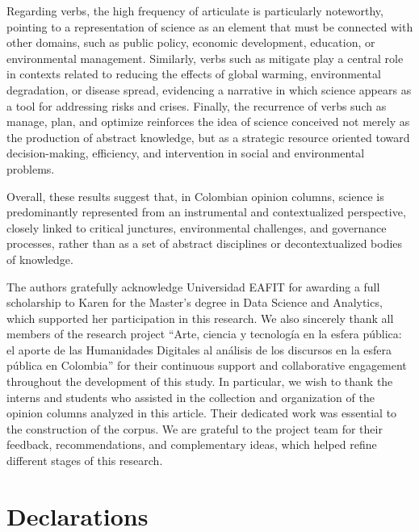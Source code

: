 \documentclass[pdflatex,sn-mathphys-num, iicol]{sn-jnl}
\begin{document}
	
	Regarding verbs, the high frequency of articulate is particularly noteworthy, pointing to a representation of science as an element that must be connected with other domains, such as public policy, economic development, education, or environmental management. Similarly, verbs such as mitigate play a central role in contexts related to reducing the effects of global warming, environmental degradation, or disease spread, evidencing a narrative in which science appears as a tool for addressing risks and crises. Finally, the recurrence of verbs such as manage, plan, and optimize reinforces the idea of science conceived not merely as the production of abstract knowledge, but as a strategic resource oriented toward decision-making, efficiency, and intervention in social and environmental problems.
	
	
	Overall, these results suggest that, in Colombian opinion columns, science is predominantly represented from an instrumental and contextualized perspective, closely linked to critical junctures, environmental challenges, and governance processes, rather than as a set of abstract disciplines or decontextualized bodies of knowledge.
	
	
	\backmatter
	
	
	The authors gratefully acknowledge Universidad EAFIT for awarding a full scholarship to Karen for the Master's degree in Data Science and Analytics, which supported her participation in this research. We also sincerely thank all members of the research project ``Arte, ciencia y tecnolog{\'i}a en la esfera p{\'u}blica: el aporte de las Humanidades Digitales al an{\'a}lisis de los discursos en la esfera p{\'u}blica en Colombia'' for their continuous support and collaborative engagement throughout the development of this study. In particular, we wish to thank the interns and students who assisted in the collection and organization of the opinion columns analyzed in this article. Their dedicated work was essential to the construction of the corpus. We are grateful to the project team for their feedback, recommendations, and complementary ideas, which helped refine different stages of this research.
	
	
	\section*{Declarations}
	
\end{document}
